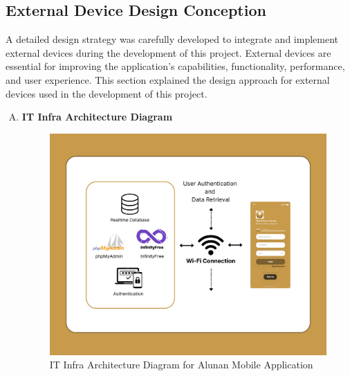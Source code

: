 \subsection{External Device Design Conception}
A detailed design strategy was carefully developed to integrate and implement external devices during the development of this project. External devices are essential for improving the application's capabilities, functionality, performance, and user experience. This section explained the design approach for external devices used in the development of this project.
\begin{enumerate}[A.]
    \item \textbf{IT Infra Architecture Diagram}
    \begin{figure}[h]
        \centering
        \includegraphics[width=0.7\linewidth]{mainmatter/images/itinfra.png}
        \caption{IT Infra Architecture Diagram for Alunan Mobile Application}
        \label{fig:myfig43}
    \end{figure}
\end{enumerate}

